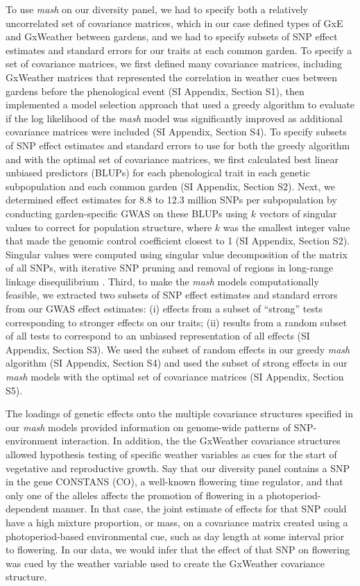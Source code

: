 \documentclass[
  9pt,
  twocolumn,
  twoside]{simple-article}%
\begin{document}
To use \emph{mash} on our diversity panel, we had to specify both a
relatively uncorrelated set of covariance matrices, which in our case
defined types of GxE and GxWeather between gardens, and we had to
specify subsets of SNP effect estimates and standard errors for our
traits at each common garden. To specify a set of covariance matrices,
we first defined many covariance matrices, including GxWeather matrices
that represented the correlation in weather cues between gardens before
the phenological event (SI Appendix, Section S1), then implemented a
model selection approach that used a greedy algorithm to evaluate if the
log likelihood of the \emph{mash} model was significantly improved as
additional covariance matrices were included (SI Appendix, Section S4).
To specify subsets of SNP effect estimates and standard errors to use
for both the greedy algorithm and with the optimal set of covariance
matrices, we first calculated best linear unbiased predictors (BLUPs)
for each phenological trait in each genetic subpopulation and each
common garden (SI Appendix, Section S2). Next, we determined effect
estimates for 8.8 to 12.3 million SNPs per subpopulation by conducting
garden-specific GWAS on these BLUPs using \(k\) vectors of singular
values to correct for population structure, where \(k\) was the smallest
integer value that made the genomic control coefficient closest to 1 (SI
Appendix, Section S2). Singular values were computed using singular
value decomposition of the matrix of all SNPs, with iterative SNP
pruning and removal of regions in long-range linkage disequilibrium
\citep{privé2017}. Third, to make the \emph{mash} models computationally
feasible, we extracted two subsets of SNP effect estimates and standard
errors from our GWAS effect estimates: (i) effects from a subset of
``strong'' tests corresponding to stronger effects on our traits; (ii)
results from a random subset of all tests to correspond to an unbiased
representation of all effects (SI Appendix, Section S3). We used the
subset of random effects in our greedy \emph{mash} algorithm (SI
Appendix, Section S4) and used the subset of strong effects in our
\emph{mash} models with the optimal set of covariance matrices (SI
Appendix, Section S5).

The loadings of genetic effects onto the multiple covariance structures
specified in our \emph{mash} models provided information on genome-wide
patterns of SNP-environment interaction. In addition, the the GxWeather
covariance structures allowed hypothesis testing of specific weather
variables as cues for the start of vegetative and reproductive growth.
Say that our diversity panel contains a SNP in the gene CONSTANS (CO), a
well-known flowering time regulator, and that only one of the alleles
affects the promotion of flowering in a photoperiod-dependent manner. In
that case, the joint estimate of effects for that SNP could have a high
mixture proportion, or mass, on a covariance matrix created using a
photoperiod-based environmental cue, such as day length at some interval
prior to flowering. In our data, we would infer that the effect of that
SNP on flowering was cued by the weather variable used to create the
GxWeather covariance structure.
\end{document}
